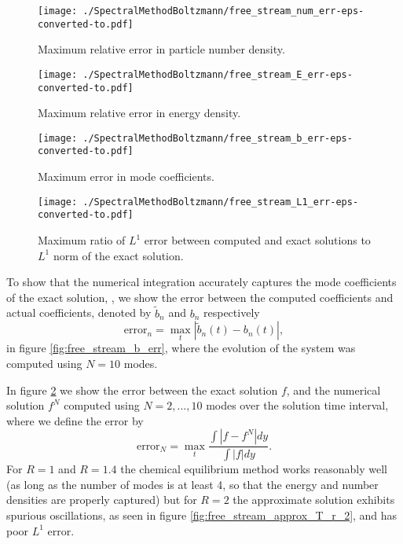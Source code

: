 \begin{figure}[H]
 \begin{minipage}[b]{0.5\linewidth}
\centerline{\texttt{[image: ./SpectralMethodBoltzmann/free\_stream\_num\_err-eps-converted-to.pdf]}}
\caption{Maximum relative error in particle number density.}\label{fig:free_stream_num_err}
 \end{minipage}
 \hspace{0.5cm}
 \begin{minipage}[b]{0.5\linewidth}
\centerline{\texttt{[image: ./SpectralMethodBoltzmann/free\_stream\_E\_err-eps-converted-to.pdf]}}
\caption{Maximum relative error in energy density.}\label{fig:free_stream_E_err}
 \end{minipage}
 \end{figure}

\begin{figure}[H]
\begin{minipage}[t]{0.5\linewidth}
\centerline{\texttt{[image: ./SpectralMethodBoltzmann/free\_stream\_b\_err-eps-converted-to.pdf]}}
\caption{Maximum error in mode coefficients.}\label{fig:free_stream_b_err}
 \end{minipage}
 \hspace{0.5cm}
 \begin{minipage}[t]{0.5\linewidth}
\centerline{\texttt{[image: ./SpectralMethodBoltzmann/free\_stream\_L1\_err-eps-converted-to.pdf]}}
\caption{Maximum ratio  of $L^1$ error between computed and exact solutions to $L^1$ norm of the exact solution.}\label{fig:free_stream_L1_err}
 \end{minipage}
 \end{figure}

 To show that the numerical integration accurately captures the mode coefficients of the exact solution, , we show the error between the computed coefficients and actual coefficients, denoted by $\tilde b_n$ and $b_n$ respectively
\begin{equation}\label{mode_err_def}
\text{error}_n=\max_{t} |\tilde{b}_n(t)-b_n(t)|,
\end{equation}
 in figure \ref{fig:free_stream_b_err}, where the evolution of the system was computed using $N=10$ modes.



In figure  \ref{fig:free_stream_L1_err} we show the error between the exact solution $f$, and the numerical solution $f^N$ computed using $N=2,...,10$ modes over the solution time interval, where we define the error by
\begin{equation}\label{f_err}
\text{error}_N=\max_{t} \frac{\int |f-f^N|dy}{\int |f|dy}.
\end{equation}
For $R=1$ and $R=1.4$  the chemical equilibrium method works reasonably well (as long as the number of modes is at least 4, so that the energy and number densities are properly captured) but for $R=2$ the approximate solution exhibits spurious oscillations, as seen in figure \ref{fig:free_stream_approx_T_r_2}, and has poor $L^1$ error.  


